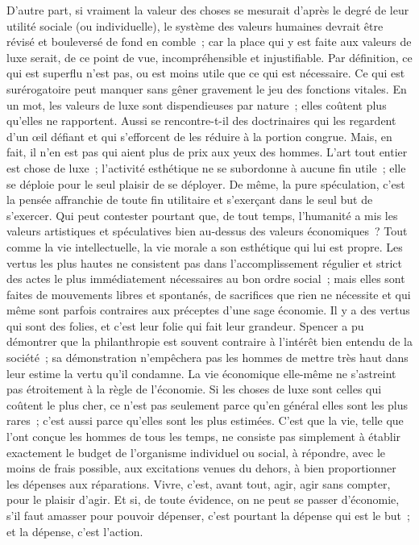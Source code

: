 \documentclass[french,twoside]{book} %
\begin{document}
D’autre part, si vraiment la valeur des choses se mesurait d’après le degré de leur utilité sociale (ou individuelle), le système des valeurs humaines devrait être révisé et bouleversé de fond en comble ; car la place qui y est faite aux valeurs de luxe serait, de ce point de vue, incompréhensible et injustifiable. Par définition, ce qui est superflu n’est pas, ou est moins utile que ce qui est nécessaire. Ce qui est surérogatoire peut manquer sans gêner gravement le jeu des fonctions vitales. En un mot, les valeurs de luxe sont dispendieuses par nature ; elles coûtent plus qu’elles ne rapportent. Aussi se rencontre-t-il des doctrinaires qui les regardent d’un œil défiant et qui s’efforcent de les réduire à la portion congrue. Mais, en fait, il n’en est pas qui aient plus de prix aux yeux des hommes. L’art tout entier est chose de luxe ; l’activité esthétique ne se subordonne à aucune fin utile ; elle se déploie pour le seul plaisir de se déployer. De même, la pure spéculation, c’est la pensée affranchie de toute fin utilitaire et s’exerçant dans le seul but de s’exercer. Qui peut contester pourtant que, de tout temps, l’humanité a mis les valeurs artistiques et spéculatives bien au-dessus des valeurs économiques ? Tout comme la vie intellectuelle, la vie morale a son esthétique qui lui est propre. Les vertus les plus hautes ne consistent pas dans l’accomplissement régulier et strict des actes le plus immédiatement nécessaires au bon ordre social ; mais elles sont faites de mouvements libres et spontanés, de sacrifices que rien ne nécessite et qui même sont parfois contraires aux préceptes d’une sage économie. Il y a des vertus qui sont des folies, et c’est leur folie qui fait leur grandeur. Spencer a pu démontrer que la philanthropie est souvent contraire à l’intérêt bien entendu de la société ; sa démonstration n’empêchera pas les hommes de mettre très haut dans leur estime la vertu qu’il condamne. La vie économique elle-même ne s’astreint pas étroitement à la règle de l’économie. Si les choses de luxe sont celles qui coûtent le plus cher, ce n’est pas seulement parce qu’en général elles sont les plus rares ; c’est aussi parce qu’elles sont les plus estimées. C’est que la vie, telle que l’ont conçue les hommes de tous les temps, ne consiste pas simplement à établir exactement le budget de l’organisme individuel ou social, à répondre, avec le moins de frais possible, aux excitations venues du dehors, à bien proportionner les dépenses aux réparations. Vivre, c’est, avant tout, agir, agir sans compter, pour le plaisir d’agir. Et si, de toute évidence, on ne peut se passer d’économie, s’il faut amasser pour pouvoir dépenser, c’est pourtant la dépense qui est le but ; et la dépense, c’est l’action.\par
\end{document}
